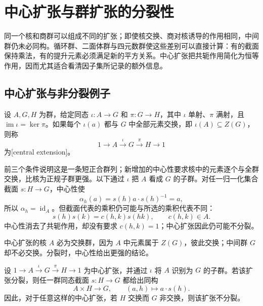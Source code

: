 
\section{中心扩张与群扩张的分裂性}
\label{b1:sec:0604}

同一个核和商群可以组成不同的扩张；即使核交换、商对核诱导的作用相同，中间群仍未必同构。循环群、二面体群与四元数群使这些差别可以直接计算：有的截面保持乘法，有的提升元素必须满足新的平方关系。中心扩张把共轭作用简化为恒等作用，因而尤其适合看清因子集所记录的额外信息。


%
%
%

\subsection{中心扩张与非分裂例子}
\label{b1:subsec:0604:01}

\begin{definition}\label{b1:def:central-extension}
	设 \(A,G,H\) 为群，给定同态 \(\iota:A\rightarrow G\) 和 \(\pi:G\rightarrow H\)，其中 \(\iota\) 单射、\(\pi\) 满射，且 \(\operatorname{im}\iota=\ker\pi\)。如果每个 \(\iota(a)\) 都与 \(G\) 中全部元素交换，即 \(\iota(A)\subseteq Z(G)\)，则称
	\[
		1\longrightarrow A\xrightarrow{\iota}G\xrightarrow{\pi}H\longrightarrow1
	\]
	为[central extension]。
\end{definition}

前三个条件说明这是一条短正合群列；新增加的中心性要求核中的元素逐个与全群交换，比核为正规子群更强。以下通过 \(\iota\) 把 \(A\) 看成 \(G\) 的子群。对任一归一化集合截面 \(s:H\rightarrow G\)，中心性使
\[
	\alpha_h(a)=s(h)a\cdot s(h)^{-1}=a,
\]
所以 \(\alpha_h=\operatorname{id}_A\)。但截面代表的乘积仍可能与所选的乘积代表不同：
\[
	s(h)s(k)=c(h,k)s(hk),\qquad c(h,k)\in A.
\]
中心性消去了共轭作用，却没有要求 \(c(h,k)=1\)；中心扩张因此仍可能不分裂。

\ProseParagraphBreak
中心扩张的核 \(A\) 必为交换群，因为 \(A\) 中元素属于 \(Z(G)\)，彼此交换；中间群 \(G\) 却不必交换。分裂时，中心性给出更强的结论。

\begin{proposition}[分裂中心扩张为直积]\label{b1:prop:split-central-extension}
	设 \(1\rightarrow A\xrightarrow{\iota}G\xrightarrow{\pi}H\rightarrow1\) 为中心扩张，并通过 \(\iota\) 将 \(A\) 识别为 \(G\) 的子群。若该扩张分裂，则任一群同态截面 \(s:H\rightarrow G\) 都给出同构
	\[
		A\times H\longrightarrow G,\qquad(a,h)\longmapsto a\cdot s(h).
	\]
	因此，对于任意这样的中心扩张，若 \(H\) 交换而 \(G\) 非交换，则该扩张不分裂。
\end{proposition}

